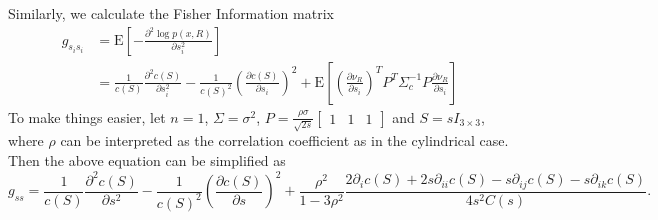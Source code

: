 \documentclass[10pt]{article}
\newcommand{\expect}[1]{\ensuremath{\mathrm{E}\left[ #1 \right]}}
\begin{document}
Similarly, we calculate the Fisher Information matrix
\begin{align}
	g_{s_is_i} &= \expect{-\frac{\partial^2 \log p(x,R)}{\partial s_i^2}} \nonumber \\
	&= \frac{1}{c(S)}\frac{\partial^2 c(S)}{\partial s_i^2} - \frac{1}{c(S)^2}\left(\frac{\partial c(S)}{\partial s_i}\right)^2 + \expect{\left(\frac{\partial \nu_R}{\partial s_i}\right)^TP^T\Sigma_c^{-1}P\frac{\partial \nu_R}{\partial s_i}}
\end{align}
To make things easier, let $n=1$, $\Sigma = \sigma^2$, $P = \frac{\rho\sigma}{\sqrt{2s}}\begin{bmatrix} 1 & 1 & 1 \end{bmatrix}$ and $S=sI_{3\times3}$, where $\rho$ can be interpreted as the correlation coefficient as in the cylindrical case.
Then the above equation can be simplified as
\begin{equation}
	g_{ss} = \frac{1}{c(S)}\frac{\partial^2 c(S)}{\partial s^2} - \frac{1}{c(S)^2}\left(\frac{\partial c(S)}{\partial s}\right)^2 + \frac{\rho^2}{1-3\rho^2} \frac{2\partial_ic(S) + 2s\partial_{ii}c(S) - s\partial_{ij}c(S) - s\partial_{ik}c(S)}{4s^2C(s)}.
\end{equation}
\end{document}
